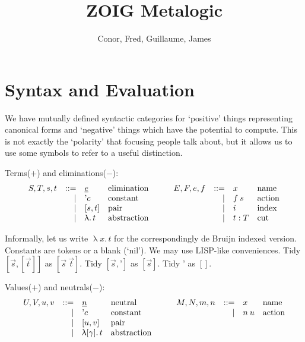 \documentclass{article}
\begin{document}
\title{\textsf{ZOIG} Metalogic}
\author{Conor, Fred, Guillaume, James}
\maketitle

\section{Syntax and Evaluation}

\newcommand{\neu}{\underline}
\newcommand{\lam}[1]{\uplambda #1.\,}
\newcommand{\quo}{\textrm{'}}

We have mutually defined syntactic categories for `positive' things
representing canonical forms and `negative' things which have the potential
to compute. This is not exactly the `polarity' that focusing people talk about,
but it allows us to use some symbols to refer to a useful distinction.

Terms($+$) and eliminations($-$):
\[
\begin{array}[t]{rrl@{\quad}l}
S,T,s,t & ::= & \neu e    & \mbox{elimination}\\
        &   | & \quo c    & \mbox{constant}\\
        &   | & [s, t]    & \mbox{pair}\\
        &   | & \lam {} t & \mbox{abstraction}\\
\end{array}
\qquad
\begin{array}[t]{rrl@{\quad}l}
E,F,e,f & ::= & x & \mbox{name}\\
        &   | & f\:s & \mbox{action}\\
        &   | & i & \mbox{index}\\
        &   | & t : T & \mbox{cut}\\
\end{array}
\]

Informally, let us write $\lam x t$ for the correspondingly de Bruijn indexed version. Constants are tokens or a blank (`nil').
We may use LISP-like conveniences.
Tidy
$[\vec{s},[\vec{t}]]$ as $[\vec{s}\: \vec{t}]$.
Tidy $[\vec{s},\quo]$ as $[\vec{s}]$.
Tidy $\quo$ as $[]$.

Values($+$) and neutrals($-$):
\[
\begin{array}[t]{rrl@{\quad}l}
U,V,u,v & ::= & \neu n    & \mbox{neutral}\\
        &   | & \quo c    & \mbox{constant}\\
        &   | & [u, v]    & \mbox{pair}\\
        &   | & \lam {[\gamma]} t & \mbox{abstraction}\\
\end{array}
\qquad
\begin{array}[t]{rrl@{\quad}l}
M,N,m,n & ::= & x & \mbox{name}\\
        &   | & n\:u & \mbox{action}\\
\end{array}
\]
\end{document}
